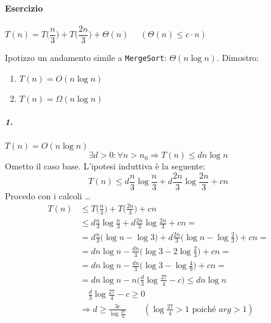 \paragraph{Esercizio} $T(n) = T\big(\dfrac{n}{3} \big) + T\big(\dfrac{2n}{3} \big) + \Theta (n)$
$\quad (\Theta (n) \leq c \cdot n)$\par
Ipotizzo un andamento simile a \texttt{MergeSort}: $\Theta (n \log n)$. Dimostro:  
\begin{enumerate}
	\item $T(n) = O(n \log n)$
	\item $T(n) = \Omega (n \log n)$
\end{enumerate}

\subparagraph{1.} $T(n) = O(n \log n)$
$$\exists d > 0 : \forall n > n_0 \Rightarrow T(n) \leq dn \log n$$
Ometto il caso base. L'ipotesi induttiva è la seguente:
\[ 
	T(n) \leq d \frac{n}{3} \log \frac{n}{3} + d \frac{2n}{3} \log \frac{2n}{3} + cn
\]
Procedo con i calcoli \dots
\begin{align*}
	T(n) & \leq T\Big(\frac{n}{3} \Big) + T\Big(\frac{2n}{3} \Big) + cn \\
	& \leq d \frac{n}{3} \log \frac{n}{3} + d \frac{2n}{3} \log \frac{2n}{3} + cn = \\
	& = d \frac{n}{3} \Big(\log n - \log 3 \Big) + d \frac{2n}{3} \Big(\log n - \log \frac{2}{3} \Big) + cn = \\
	& = dn \log n - \frac{dn}{3} \Big( \log 3 - 2 \log \frac{2}{3} \Big) + cn = \\
	& = dn \log n - \frac{dn}{3} \Big( \log 3 - \log \frac{4}{9} \Big) + cn = \\
	& = dn \log n - n \Big( \frac{d}{3} \log \frac{27}{4} - c \Big) \leq dn \log n\\
	& \quad \frac{d}{3} \log \frac{27}{4} - c \geq 0 \\
	& \Rightarrow d \geq \frac{3c}{\log \frac{27}{4}} \qquad (\log \frac{27}{4} > 1 \text{ poiché } arg > 1)
\end{align*}


